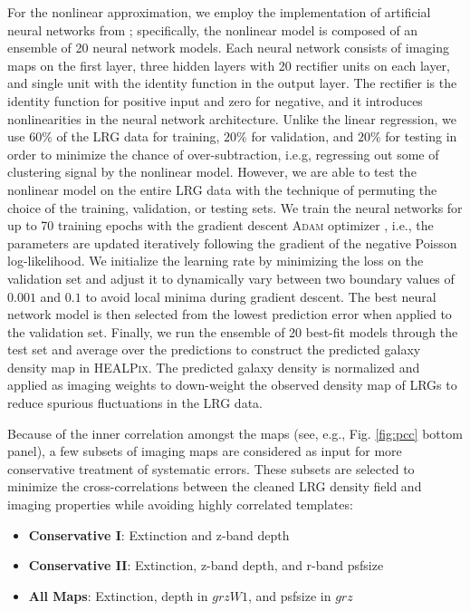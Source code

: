 For the nonlinear approximation, we employ the implementation of artificial neural networks from \cite{rezaie2021primordial}; specifically, the nonlinear model is composed of an ensemble of 20 neural network models. Each neural network consists of imaging maps on the first layer, three hidden layers with 20 rectifier units on each layer, and single unit with the identity function in the output layer. The rectifier is the identity function for positive input and zero for negative, and it introduces nonlinearities in the neural network architecture. Unlike the linear regression, we use $60\%$ of the LRG data for training, $20\%$ for validation, and $20\%$ for testing in order to minimize the chance of over-subtraction, i.e.g, regressing out some of clustering signal by the nonlinear model. However, we are able to test the nonlinear model on the entire LRG data with the technique of permuting the choice of the training, validation, or testing sets. We train the neural networks for up to 70 training epochs with the gradient descent \textsc{Adam} optimizer \citep{2017arXiv171105101L}, i.e., the parameters are updated iteratively following the gradient of the negative Poisson log-likelihood. We initialize the learning rate by minimizing the loss on the validation set and adjust it to dynamically vary between two boundary values of $0.001$ and $0.1$ to avoid local minima during gradient descent. The best neural network model is then selected from the lowest prediction error when applied to the validation set. Finally, we run the ensemble of 20 best-fit models through the test set and average over the predictions to construct the predicted galaxy density map in \textsc{HEALPix}. The predicted galaxy density is normalized and applied as imaging weights to down-weight the observed density map of LRGs to reduce spurious fluctuations in the LRG data. 

Because of the inner correlation amongst the maps (see, e.g., Fig. \ref{fig:pcc} bottom panel), a few subsets of imaging maps are considered as input for more conservative treatment of systematic errors. These subsets are selected to minimize the cross-correlations between the cleaned LRG density field and imaging properties while avoiding highly correlated templates:
\begin{itemize}
\item \textbf{Conservative I}: Extinction and z-band depth
\item \textbf{Conservative II}: Extinction, z-band depth, and r-band psfsize
\item \textbf{All Maps}: Extinction, depth in $grzW1$, and psfsize in $grz$
\end{itemize}

